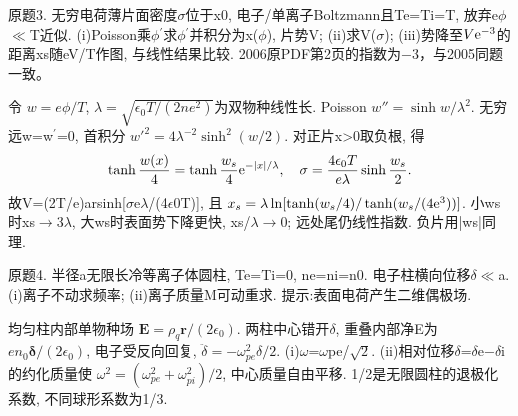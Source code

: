 \begin{exercise}\label{ex:06-1-3}
原题3. 无穷电荷薄片面密度\ensuremath{\sigma}位于x0, 电子/单离子Boltzmann且Te=Ti=T, 放弃e\ensuremath{\phi}\ensuremath{\ll}T近似. (i)Poisson乘\ensuremath{\phi}\ensuremath{{}^{\prime}}求\ensuremath{\phi}\ensuremath{{}^{\prime}}并积分为x(\ensuremath{\phi}), 片势V; (ii)求V(\ensuremath{\sigma}); (iii)势降至$V\mathrm e^{-3}$的距离xs随eV/T作图, 与线性结果比较. 2006原PDF第2页的指数为$-3$，与2005同题一致。
\end{exercise}
\begin{solution}
令 $w=e\phi/T$, $\lambda=\sqrt{\epsilon_0T/(2ne^2)}$为双物种线性长. Poisson $w''=\sinh w/\lambda^2$. 无穷远w=w\ensuremath{{}^{\prime}}=0, 首积分 $w'^2=4\lambda^{-2}\sinh^2(w/2)$. 对正片x>0取负根, 得
\begin{equation}
 \tanh\frac{w(x)}4=\tanh\frac{w_s}4\mathrm e^{-|x|/\lambda},\quad
 \sigma=\frac{4\epsilon_0T}{e\lambda}\sinh\frac{w_s}2.
\end{equation}
故V=(2T/e)arsinh[\ensuremath{\sigma}e\ensuremath{\lambda}/(4\ensuremath{\epsilon}0T)], 且 $x_s=\lambda\ln[\tanh(w_s/4)/\tanh(w_s/(4\mathrm e^3))]$. 小ws时xs\ensuremath{\to}3\ensuremath{\lambda}, 大ws时表面势下降更快, xs/\ensuremath{\lambda}\ensuremath{\to}0; 远处尾仍线性指数. 负片用|ws|同理.
\begin{center}\end{center}
\end{solution}
\begin{exercise}\label{ex:06-1-4}
原题4. 半径a无限长冷等离子体圆柱, Te=Ti=0, ne=ni=n0. 电子柱横向位移\ensuremath{\delta}\ensuremath{\ll}a. (i)离子不动求频率; (ii)离子质量M可动重求. 提示:表面电荷产生二维偶极场.
\end{exercise}
\begin{solution}
均匀柱内部单物种场 $\mathbf E=\rho_q\mathbf r/(2\epsilon_0)$. 两柱中心错开\ensuremath{\delta}, 重叠内部净E为 $en_0\boldsymbol\delta/(2\epsilon_0)$, 电子受反向回复, $\ddot\delta=-\omega_{pe}^2\delta/2$. (i)\ensuremath{\omega}=\ensuremath{\omega}pe/\ensuremath{\sqrt2}. (ii)相对位移\ensuremath{\delta}=\ensuremath{\delta}e\ensuremath{-}\ensuremath{\delta}i的约化质量使 $\omega^2=(\omega_{pe}^2+\omega_{pi}^2)/2$, 中心质量自由平移. 1/2是无限圆柱的退极化系数, 不同球形系数为1/3.
\end{solution}
